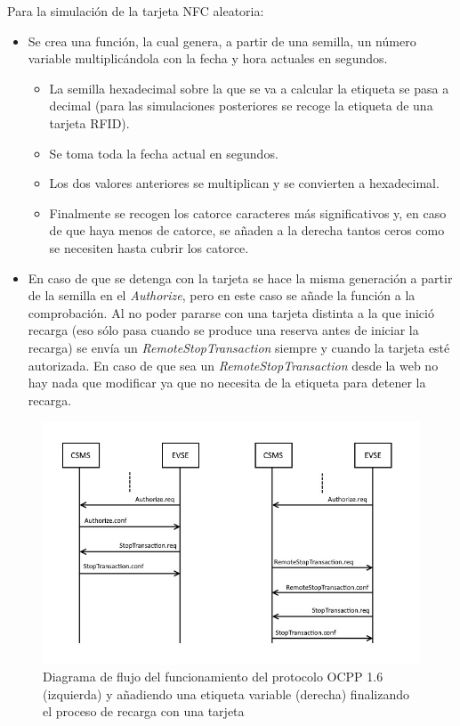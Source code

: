 \documentclass[12pt,a4paper,onecolumn,oneside]{report}
\begin{document}
Para la simulación de la tarjeta NFC aleatoria:
\begin{itemize}
\item Se crea una función, la cual genera, a partir de una semilla, un número variable multiplicándola con la fecha y hora actuales en segundos.
\begin{itemize}
\item La semilla hexadecimal sobre la que se va a calcular la etiqueta se pasa a decimal (para las simulaciones posteriores se recoge la etiqueta de una tarjeta RFID).
\item Se toma toda la fecha actual en segundos.
\item Los dos valores anteriores se multiplican y se convierten a hexadecimal.
\item Finalmente se recogen los catorce caracteres más significativos y, en caso de que haya menos de catorce, se añaden a la derecha tantos ceros como se necesiten hasta cubrir los catorce.
\end{itemize}
\item En caso de que se detenga con la tarjeta se hace la misma generación a partir de la semilla en el \textit{Authorize}, pero en este caso se añade la función a la comprobación. Al no poder pararse con una tarjeta distinta a la que inició recarga (eso sólo pasa cuando se produce una reserva antes de iniciar la recarga) se envía un \textit{RemoteStopTransaction} siempre y cuando la tarjeta esté autorizada. En caso de que sea un \textit{RemoteStopTransaction} desde la web no hay nada que modificar ya que no necesita de la etiqueta para detener la recarga.
\end{itemize}
\begin{figure}[H] 
\centering
  \includegraphics[width=1\textwidth]{figuras/diagramaNFCvariable.png}
  \caption[Diagrama de flujo del funcionamiento del protocolo OCPP 1.6 (izquierda) y añadiendo una etiqueta variable (derecha) finalizando el proceso de recarga con una tarjeta]{Diagrama de flujo del funcionamiento del protocolo OCPP 1.6 (izquierda) y añadiendo una etiqueta variable (derecha) finalizando el proceso de recarga con una tarjeta\\
  }
  \label{fig:diagramanfc}
\end{figure}
\end{document}
